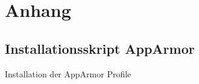 \section{Anhang}

\subsection{Installationsskript AppArmor}

\begin{listing}[ht]{}
    \caption{Installation der AppArmor Profile}
    \label{listing:installation_apparmor}
\end{listing}
